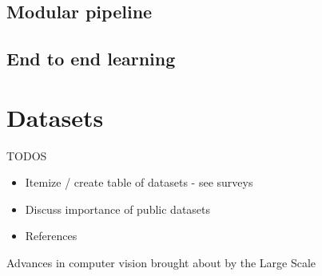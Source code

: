 \subsection{Modular pipeline}

\subsection{End to end learning}



\lipsum[1]

\section{Datasets}

TODOS

\begin{itemize}
    \item Itemize / create table of datasets - see surveys
    \item Discuss importance of public datasets
    \item References
\end{itemize}

Advances in computer vision brought about by the Large Scale 

\lipsum[2]
